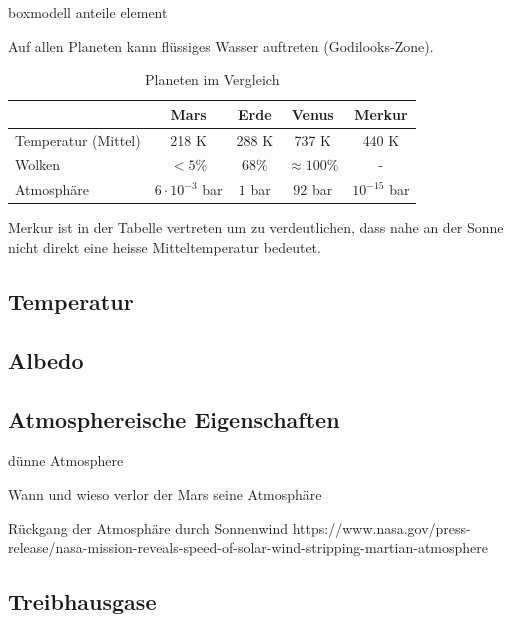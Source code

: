 \begin{refsection}
boxmodell anteile element



Auf allen Planeten kann flüssiges Wasser auftreten (Godilooks-Zone).

\begin{center}
\begin{table}
	\center
	\begin{tabular}{l|c c c c}
                      & Mars    & Erde   & Venus           & Merkur\\
  \hline
  Temperatur (Mittel) & 218 K   & 288 K  & 737 K           & 440 K\\
  Wolken              & $<5\%$ & $68\%$ & $\approx100\%$ & - \\
  Atmosphäre          & $6 \cdot 10^{-3}$ bar & $1$ bar & $92$ bar & $10^{-15}$ bar
	
\end{tabular}
\caption{Planeten im Vergleich}
\end{table}

\end{center}

Merkur ist in der Tabelle vertreten um zu verdeutlichen, dass nahe an der Sonne nicht direkt eine heisse Mitteltemperatur bedeutet.


\subsection{Temperatur}

\subsection{Albedo}

\subsection{Atmosphereische Eigenschaften}

dünne Atmosphere

Wann und wieso verlor der Mars seine Atmosphäre


Rückgang der Atmosphäre durch Sonnenwind
	https://www.nasa.gov/press-release/nasa-mission-reveals-speed-of-solar-wind-stripping-martian-atmosphere


\subsection{Treibhausgase}


\end{refsection}
